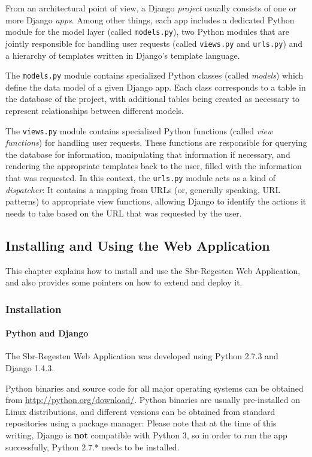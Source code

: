 From an architectural point of view, a Django \emph{project} usually
consists of one or more Django \emph{apps}. Among other things, each
app includes a dedicated Python module for the model layer (called
\texttt{models.py}), two Python modules that are jointly responsible for
handling user requests (called \texttt{views.py} and \texttt{urls.py})
and a hierarchy of templates written in Django's template language.

The \texttt{models.py} module contains specialized Python classes
(called \emph{models}) which define the data model of a given Django
app. Each class corresponds to a table in the database of the project,
with additional tables being created as necessary to represent
relationships between different models.

The \texttt{views.py} module contains specialized Python functions
(called \emph{view functions}) for handling user requests. These
functions are responsible for querying the database for information,
manipulating that information if necessary, and rendering the
appropriate templates back to the user, filled with the information
that was requested. In this context, the \texttt{urls.py} module acts
as a kind of \emph{dispatcher}: It contains a mapping from URLs (or,
generally speaking, URL patterns) to appropriate view functions,
allowing Django to identify the actions it needs to take based on the
URL that was requested by the user.

\subsection{Installing and Using the Web Application}
\label{sec:webapp}

This chapter explains how to install and use the Sbr-Regesten Web
Application, and also provides some pointers on how to extend and
deploy it.

\subsubsection{Installation}
\label{sec:install}

\paragraph{Python and Django}
The Sbr-Regesten Web Application was developed using Python 2.7.3 and
Django 1.4.3.

Python binaries and source code for all major operating systems can be
obtained from \url{http://python.org/download/}. Python binaries are
usually pre-installed on Linux distributions, and different versions
can be obtained from standard repositories using a package manager:
Please note that at the time of this writing, Django is \textbf{not}
compatible with Python 3, so in order to run the app successfully,
Python 2.7.* needs to be installed.

